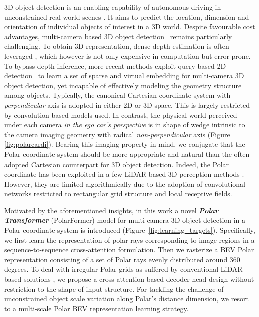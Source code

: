 \documentclass[letterpaper]{article} \usepackage{aaai23}  \usepackage{times}  \usepackage{helvet}  \usepackage{courier}  \usepackage[hyphens]{url}  \usepackage{graphicx} \urlstyle{rm} \def\UrlFont{\rm}  \usepackage{natbib}  \usepackage{caption} \frenchspacing  \setlength{\pdfpagewidth}{8.5in} \setlength{\pdfpageheight}{11in} \usepackage{algorithm}
\begin{document}
3D object detection is an enabling capability of autonomous driving in unconstrained real-world scenes \cite{wang2022detr3d,wang2021fcos3d}.
It aims to predict the location, dimension and orientation of individual objects of interest in a 3D world.
Despite favourable cost advantages, multi-camera based 3D object detection~\cite{wang2021fcos3d,wang2022probabilistic,wang2022detr3d,zhou2019objects} remains particularly challenging.
To obtain 3D representation, 
dense depth estimation is often leveraged \cite{philion2020lift},
which however is not only expensive in computation
but error prone.
To bypass depth inference, more recent methods \cite{wang2022detr3d,li2022bevformer} exploit 
query-based 2D detection~\cite{carion2020end}
to learn a set of sparse and virtual embedding for multi-camera 3D object detection, yet incapable of effectively modeling the geometry structure among objects.
Typically, the canonical Cartesian coordinate system with {\em perpendicular} axis is adopted in
either 2D \cite{zhou2019objects,wang2021fcos3d} or 3D \cite{wang2022detr3d,li2022bevformer} space.
This is largely restricted by convolution based models used.
In contrast, the physical world perceived under each camera {\em in the ego car's perspective} is in shape of wedge intrinsic to the camera imaging geometry with radical 
{\em non-perpendicular} axis (Figure \ref{fig:polarcardi}).
Bearing this imaging property in mind, we conjugate that the Polar coordinate system should be more appropriate and natural than the often adopted Cartesian counterpart
for 3D object detection.
Indeed, the Polar coordinate has been exploited in a few LiDAR-based 3D perception methods \cite{zhang2020polarnet,bewley2020range,rapoport2021s,zhu2021cylindrical}.
However, they are limited algorithmically due to the adoption of convolutional networks restricted to rectangular grid structure and local receptive fields.

Motivated by the aforementioned insights, in this work a novel {\bf\em Polar Transformer} (PolarFormer) model for multi-camera 3D object detection in a Polar coordinate system is introduced (Figure~\ref{fig:learning_targets}).
Specifically, we first learn the representation of polar rays corresponding to image regions in a sequence-to-sequence cross-attention formulation.
Then we rasterize a BEV Polar representation consisting of a set of Polar rays evenly distributed around 360 degrees.
To deal with irregular Polar grids as suffered by conventional LiDAR based solutions \cite{zhang2020polarnet,bewley2020range,rapoport2021s,zhu2021cylindrical}, 
we propose a cross-attention based decoder head design without
restriction to the shape of input structure.
For tackling the challenge of unconstrained object scale variation along Polar's distance dimension, we resort to a multi-scale Polar BEV representation learning strategy.
\end{document}

